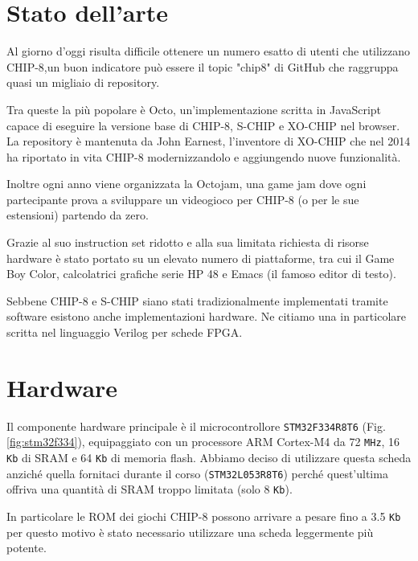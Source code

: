 \documentclass[a4paper]{article}
\begin{document}
\section{Stato dell'arte}

Al giorno d'oggi risulta difficile ottenere un numero esatto di utenti che
utilizzano CHIP-8,un buon indicatore può essere il topic "chip8" di GitHub
che raggruppa quasi un migliaio di repository.

Tra queste la più popolare è Octo, un'implementazione scritta in JavaScript
capace di eseguire la versione base di CHIP-8, S-CHIP e XO-CHIP nel browser.
La repository è mantenuta da John Earnest, l'inventore di XO-CHIP che nel 2014
ha riportato in vita CHIP-8 modernizzandolo e aggiungendo nuove funzionalità.

Inoltre ogni anno viene organizzata la Octojam, una game jam dove ogni partecipante
prova a sviluppare un videogioco per CHIP-8 (o per le sue estensioni) partendo da zero.

Grazie al suo instruction set ridotto e alla sua limitata richiesta di risorse hardware
è stato portato su un elevato numero di piattaforme, tra cui il Game Boy Color, calcolatrici
grafiche serie HP 48 e Emacs (il famoso editor di testo).

Sebbene CHIP-8 e S-CHIP siano stati tradizionalmente implementati tramite software
esistono anche implementazioni hardware. Ne citiamo una in particolare scritta nel
linguaggio Verilog per schede FPGA.

\section{Hardware}\label{sec:hardware}

Il componente hardware principale è il microcontrollore \texttt{STM32F334R8T6}
(Fig. \ref{fig:stm32f334}), equipaggiato con un processore ARM Cortex-M4
da 72 \texttt{MHz}, 16 \texttt{Kb} di SRAM e 64 \texttt{Kb}
di memoria flash. Abbiamo deciso di utilizzare questa scheda anziché
quella fornitaci durante il corso (\texttt{STM32L053R8T6}) perché quest'ultima
offriva una quantità di SRAM troppo limitata (solo 8 \texttt{Kb}).

In particolare le ROM dei giochi CHIP-8 possono arrivare a pesare
fino a 3.5 \texttt{Kb} per questo motivo è stato necessario utilizzare
una scheda leggermente più potente.
\end{document}
